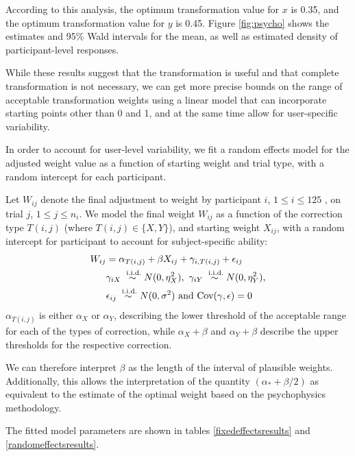 \documentclass[11pt]{isuthesis}\usepackage[]{graphicx}\usepackage[]{color}
\begin{document}
According to this analysis, the optimum transformation value for $x$ is 0.35, and the optimum transformation value for $y$ is 0.45. Figure \ref{fig:psycho} shows the estimates and 95\% Wald intervals for the mean, as well as estimated density of participant-level responses. 

While these results suggest that the transformation is useful and that complete transformation is not necessary, we can get more precise bounds on the range of acceptable transformation weights using a linear model that can incorporate starting points other than 0 and 1, and at the same time allow for user-specific variability.

In order to account for user-level variability, we fit a random effects model for the adjusted weight value as a function of  starting weight and trial type, with a random intercept for each participant. 

Let $W_{ij}$ denote the final adjustment to weight by participant $i$, $ 1 \le i \le 125$ , on trial $j$, $1 \le j \le n_i$. 
We model the final weight $W_{ij}$ as a function of the correction type $T(i,j)$  (where $T(i,j) \in  \{X, Y\}$), and starting weight $X_{ij}$, with a random intercept for participant to account for subject-specific ability: 
\begin{align}\label{model1}
W_{ij} &= \alpha_{T(i,j)} + \beta X_{ij} + \gamma_{i, T(i,j)} + \epsilon_{ij}\\
& \gamma_{iX} \stackrel{\text{ i.i.d.}}{\sim} N(0, \eta_X^2) , \ \gamma_{iY} \stackrel{\text{ i.i.d.}}{\sim} N(0, \eta_Y^2) ,\notag  \\
& \epsilon_{ij} \stackrel{\text{ i.i.d.}}{\sim} N(0, \sigma^2)  \text{ and } \text{Cov}(\gamma, \epsilon) = 0\notag 
\end{align}
 $\alpha_{T(i,j)}$ is either $\alpha_X$ or $\alpha_Y$, describing the lower threshold of the acceptable range for each of the types of correction, while $\alpha_X+\beta$ and $\alpha_Y + \beta$ describe the upper thresholds for the respective correction.

We can therefore interpret $\beta$ as the length of the interval of plausible weights. Additionally, this allows the interpretation of the quantity $(\alpha_* + \beta/2)$ as equivalent to the estimate of the optimal weight based on the psychophysics methodology.

\noindent
The fitted model parameters are shown in tables \ref{fixedeffectsresults} and \ref{randomeffectsresults}. 
\end{document}
